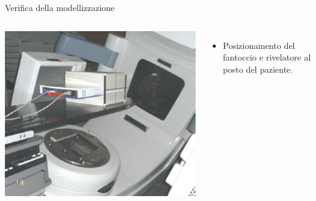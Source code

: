 \documentclass{beamer}
\begin{document}
\begin{frame}[t]{Verifica della modellizzazione}
{\begin{columns}
\centering
\includegraphics[width=.8\textwidth]{../cap2/MatriXX_Cube.png}
\begin{itemize}
\tiny
\item Posizionamento del fantoccio e rivelatore al posto del paziente.
\end{itemize}
\end{columns}
}
\end{frame}
\end{document}
